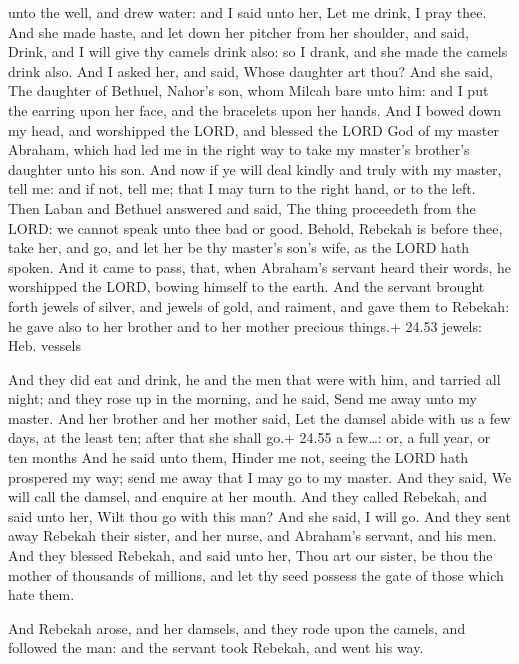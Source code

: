 unto the well, and drew water: and I said unto her, Let me drink, I pray
thee.  And she made haste, and let down her pitcher from
her shoulder, and said, Drink, and I will give thy camels drink also: so
I drank, and she made the camels drink also.  And I asked
her, and said, Whose daughter art thou? And she said, The daughter of
Bethuel, Nahor's son, whom Milcah bare unto him: and I put the earring
upon her face, and the bracelets upon her hands.  And I
bowed down my head, and worshipped the LORD, and blessed the LORD God of
my master Abraham, which had led me in the right way to take my master's
brother's daughter unto his son.  And now if ye will deal
kindly and truly with my master, tell me: and if not, tell me; that I
may turn to the right hand, or to the left.  Then Laban and
Bethuel answered and said, The thing proceedeth from the LORD: we cannot
speak unto thee bad or good.  Behold, Rebekah is before
thee, take her, and go, and let her be thy master's son's wife, as the
LORD hath spoken.  And it came to pass, that, when
Abraham's servant heard their words, he worshipped the LORD, bowing
himself to the earth.  And the servant brought forth jewels
of silver, and jewels of gold, and raiment, and gave them to Rebekah: he
gave also to her brother and to her mother precious things.+ 24.53
jewels: Heb. vessels

 And they did eat and drink, he and the men that were with
him, and tarried all night; and they rose up in the morning, and he
said, Send me away unto my master.  And her brother and her
mother said, Let the damsel abide with us a few days, at the least ten;
after that she shall go.+ 24.55 a few\ldots: or, a full year, or ten
months  And he said unto them, Hinder me not, seeing the
LORD hath prospered my way; send me away that I may go to my master.
 And they said, We will call the damsel, and enquire at her
mouth.  And they called Rebekah, and said unto her, Wilt
thou go with this man? And she said, I will go.  And they
sent away Rebekah their sister, and her nurse, and Abraham's servant,
and his men.  And they blessed Rebekah, and said unto her,
Thou art our sister, be thou the mother of thousands of millions, and
let thy seed possess the gate of those which hate them.

 And Rebekah arose, and her damsels, and they rode upon
the camels, and followed the man: and the servant took Rebekah, and went
his way.

